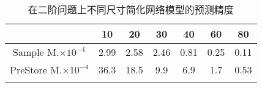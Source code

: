 \begin{center}
\begin{table}
	\caption{在二阶问题上不同尺寸简化网络模型的预测精度}
	\renewcommand\arraystretch{1.2}
	\setlength{\tabcolsep}{12pt}
	\begin{tabular}{ccccccc}
	\toprule
		 							&	10		&	20		&	30		&	40		&	60		&	80		\\	\midrule
	Sample M.\(\times 10^{-4}\)	&	2.99	&	2.58	&	2.46	&	0.81	&	0.25	&	0.11	 \\	\hline
	PreStore M.\(\times 10^{-4}\)&	36.3	&	18.5	&	9.9		&	6.9		&	1.7		&	0.53	\\	
	\bottomrule
	\label{tab:second}
	\end{tabular}
\end{table}
\vspace{-3em}
\end{center}

